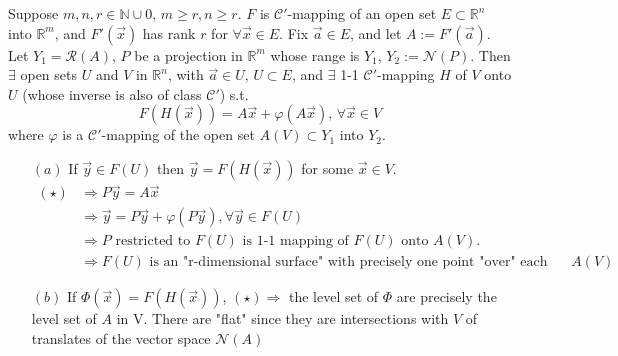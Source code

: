 \begin{theorem}
    Suppose  $ m,n,r\in \mathbb{N}\cup{0},\, m\geqslant r,n\geqslant r$.  $ F  $ is  $ \mathscr{C}' $-mapping of an open set  $ E\subset \mathbb{R}^n $ into  $ \mathbb{R}^m  $, and  $ F'(\vec{x}) $ has rank  $ r  $ for  $ \forall \vec{x}\in E    $.  Fix  $\vec{a}\in E  $, and let  $ A:=F'(\vec{a}) $. Let  $ Y_1=\mathscr{R }(A) $,  $ P  $ be a projection in  $ \mathbb{R}^m   $ whose range is  $ Y_1 $,  $ Y_2:= \mathscr{N}(P )$. Then  $ \exists $ open sets  $ U  $ and  $ V  $ in  $ \mathbb{R}^n   $, with   $ \vec{a}\in U,\,U\subset E  $, and  $ \exists   $ 1-1 $ \mathscr{C}'  $-mapping  $ H  $ of  $ V  $ onto    $ U  $ (whose inverse is also of class  $ \mathscr{C}' $) s.t.
    \begin{equation}
        F(H(\vec{x}))=A\vec{x}+\varphi(A\vec{x}),\,\forall \vec{x}\in V\tag{ $ \star $ }
    \end{equation}      
    where  $ \varphi  $ is a  $ \mathscr{C}' $-mapping of the open set  $ A(V)\subset Y_1 $ into  $ Y_2 $.  
\end{theorem}
\begin{remark}\end{remark}
    \begin{enumerate}
        \item[$ (a) $] If  $ \vec{y}\in F(U)  $ then  $ \vec{y}=F(H(\vec{x})) $ for some  $ \vec{x}\in V $.
         \begin{align*}
            (\star)&\Rightarrow P\vec{y}=A\vec{x}\\
            &\Rightarrow\vec{y}=P\vec{y}+\varphi(P\vec{y}),\forall \vec{y}\in F(U)\\\
            &\Rightarrow P \text{ restricted to }F(U)\text{ is  1-1 mapping of }F(U)\text{ onto }A(V).\\
            &\Rightarrow F(U) \text{ is an "r-dimensional surface" with precisely one point "over" each point of }A(V)
         \end{align*} 
         \item[$ (b) $] If  $ \Phi(\vec{x})=F(H(\vec{x})) $,  $ (\star)\Rightarrow  $ the level set of  $ \Phi $ are precisely the level set of  $ A $ in V. There are "flat" since they are intersections with  $ V $ of translates of the vector space  $ \mathscr{N}(A) $ 
    \end{enumerate}

